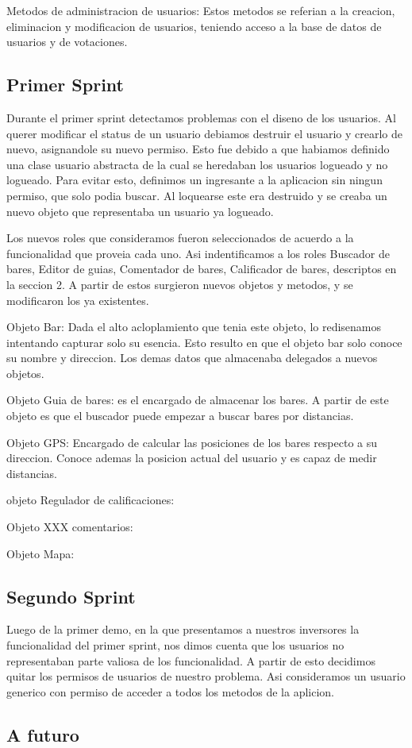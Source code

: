 Metodos de administracion de usuarios: Estos metodos se referian a la creacion, eliminacion y modificacion de usuarios, teniendo acceso a la base de datos de usuarios y de votaciones.


\subsection{Primer Sprint}

Durante el primer sprint detectamos problemas con el diseno de los usuarios. Al querer modificar el status de un usuario debiamos destruir el usuario y crearlo de nuevo, asignandole su nuevo
permiso. Esto fue debido a que habiamos definido una clase usuario abstracta de la cual se heredaban los usuarios logueado y no logueado. Para evitar esto, definimos un ingresante a la aplicacion sin ningun permiso, que solo podia buscar. Al loquearse este era destruido y se creaba
un nuevo objeto que representaba un usuario ya logueado.

Los nuevos roles que consideramos fueron seleccionados de acuerdo a la funcionalidad que proveia cada uno. Asi indentificamos a los roles Buscador de bares, Editor de guias, Comentador
de bares, Calificador de bares, descriptos en la seccion 2. A partir de estos surgieron nuevos objetos y metodos, y se modificaron los ya existentes.

Objeto Bar: Dada el alto acloplamiento que tenia este objeto, lo redisenamos intentando capturar solo su esencia. Esto resulto en que el objeto bar solo conoce su nombre y direccion. 
Los demas datos que almacenaba delegados a nuevos objetos.

Objeto Guia de bares: es el encargado de almacenar los bares. A partir de este objeto es que el buscador puede empezar a buscar bares por distancias.

Objeto GPS: Encargado de calcular las posiciones de los bares respecto a su direccion. Conoce ademas la posicion actual del usuario y es capaz de medir distancias.

objeto Regulador de calificaciones:

Objeto XXX comentarios:

Objeto Mapa:

\subsection{Segundo Sprint}

Luego de la primer demo, en la que presentamos a nuestros inversores la funcionalidad del primer sprint, nos dimos cuenta que los usuarios 
no representaban parte valiosa de los funcionalidad. A partir de esto decidimos quitar los permisos de usuarios de nuestro problema. Asi consideramos un usuario generico con permiso de 
acceder a todos los metodos de la aplicion.

\subsection{A futuro}


